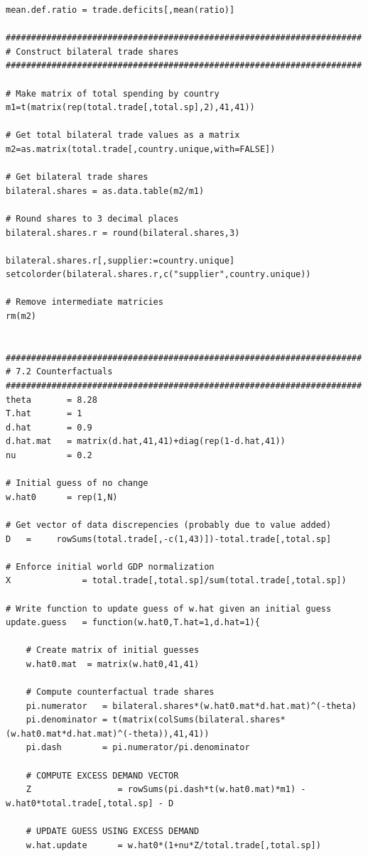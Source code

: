 \documentclass[12pt]{article}
\begin{document}
\begin{verbatim}
mean.def.ratio = trade.deficits[,mean(ratio)]

######################################################################
# Construct bilateral trade shares
######################################################################

# Make matrix of total spending by country
m1=t(matrix(rep(total.trade[,total.sp],2),41,41))

# Get total bilateral trade values as a matrix
m2=as.matrix(total.trade[,country.unique,with=FALSE])

# Get bilateral trade shares
bilateral.shares = as.data.table(m2/m1)

# Round shares to 3 decimal places
bilateral.shares.r = round(bilateral.shares,3)

bilateral.shares.r[,supplier:=country.unique]
setcolorder(bilateral.shares.r,c("supplier",country.unique))

# Remove intermediate matricies
rm(m2)


######################################################################
# 7.2 Counterfactuals
######################################################################
theta       = 8.28
T.hat       = 1
d.hat       = 0.9
d.hat.mat   = matrix(d.hat,41,41)+diag(rep(1-d.hat,41))
nu          = 0.2

# Initial guess of no change
w.hat0      = rep(1,N)

# Get vector of data discrepencies (probably due to value added)
D   =     rowSums(total.trade[,-c(1,43)])-total.trade[,total.sp]

# Enforce initial world GDP normalization
X              = total.trade[,total.sp]/sum(total.trade[,total.sp])

# Write function to update guess of w.hat given an initial guess
update.guess   = function(w.hat0,T.hat=1,d.hat=1){
    
    # Create matrix of initial guesses
    w.hat0.mat  = matrix(w.hat0,41,41)
    
    # Compute counterfactual trade shares
    pi.numerator   = bilateral.shares*(w.hat0.mat*d.hat.mat)^(-theta)
    pi.denominator = t(matrix(colSums(bilateral.shares*(w.hat0.mat*d.hat.mat)^(-theta)),41,41))
    pi.dash        = pi.numerator/pi.denominator
    
    # COMPUTE EXCESS DEMAND VECTOR
    Z                 = rowSums(pi.dash*t(w.hat0.mat)*m1) - w.hat0*total.trade[,total.sp] - D
    
    # UPDATE GUESS USING EXCESS DEMAND
    w.hat.update      = w.hat0*(1+nu*Z/total.trade[,total.sp])
    

\end{verbatim}
\end{document}
